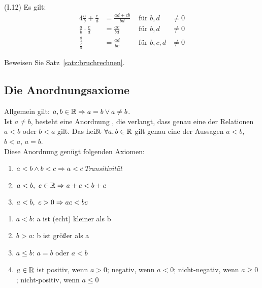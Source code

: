 \begin{satz}
    \label{satz:bruchrechnen}
    ~\\(I.12) Es gilt:
    \setcounter{equation}{0}
    \begin{alignat}{4}
        \frac{a}{b} + \frac{c}{d} &= \frac{ad+cb}{bd} &\text{ für } b,d&\neq 0\\[10pt]
        \frac{a}{b} \cdot \frac{c}{d} &= \frac{ac}{bd} &\text{ für } b,d&\neq 0\\[10pt]
        \frac{\frac{a}{b}}{\frac{c}{d}} &= \frac{ad}{bc} &\text{ für } b,c,d&\neq 0
    \end{alignat}
    \begin{uebung}
        Beweisen Sie Satz~\ref{satz:bruchrechnen}.
    \end{uebung}
\end{satz}

\subsection{Die Anordnungsaxiome}

Allgemein gilt: $a,b\in\mathbb{R} \Rightarrow{} a = b \lor a \neq b$.\\
Ist $a\neq b$, besteht eine Anordnung \anf{$<$}, die verlangt, dass genau eine der Relationen $a<b$ oder $b<a$ gilt.
Das heißt $\forall a,b\in\mathbb{R}$ gilt genau eine der Aussagen $a<b$, $b<a$, $a=b$.\\
Diese Anordnung genügt folgenden Axiomen:
\begin{axiom}[Anordnungsaxiome]
    \theoremescape
    \begin{enumerate}[label=(II.\arabic*)]
        \item $a<b \land b < c \Rightarrow{} a < c$\quad \textit{Transitivität}
        \item $a<b,~c \in\mathbb{R} \Rightarrow{} a + c < b + c$
        \item $a<b,~c > 0 \Rightarrow{} ac < bc$
    \end{enumerate}
\end{axiom}

\begin{notation}
    \theoremescape
    \begin{enumerate}[label=-]
        \item $a < b$: a ist (echt) kleiner als b
        \item $b > a$: b ist größer als a
        \item $a\leq b$: $a=b$ oder $a < b$
        \item $a\in\mathbb{R}$ ist positiv, wenn $a>0$; negativ, wenn $a <0$; nicht-negativ, wenn $a\geq 0$; nicht-positiv, wenn $a\leq 0$
    \end{enumerate}
\end{notation}

